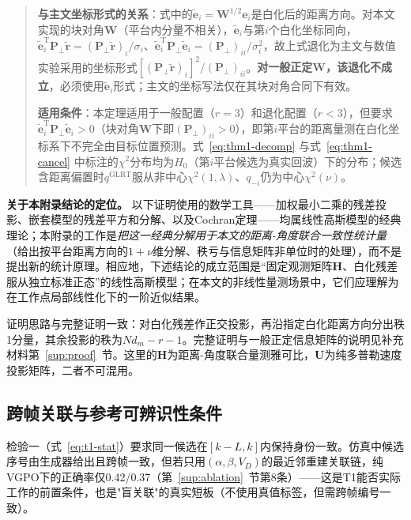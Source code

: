 \documentclass[UTF8,a4paper,zihao=-4]{ctexart}
\begin{document}
\begin{quote}
\textbf{与主文坐标形式的关系}：式中的\(\widetilde{\mathbf{e}}_i=\mathbf{W}^{1/2}\mathbf{e}_i\)是白化后的距离方向。对本文实现的块对角\(\mathbf{W}\)（平台内分量不相关），\(\widetilde{\mathbf{e}}_i\)与第\(i\)个白化坐标同向，\(\widetilde{\mathbf{e}}_i^{\mathrm{T}}\mathbf{P}_{\perp}\widetilde{\mathbf{r}}=(\mathbf{P}_{\perp}\widetilde{\mathbf{r}})_i/\sigma_i\)、\(\widetilde{\mathbf{e}}_i^{\mathrm{T}}\mathbf{P}_{\perp}\widetilde{\mathbf{e}}_i=(\mathbf{P}_{\perp})_{ii}/\sigma_i^2\)，故上式退化为主文与数值实验采用的坐标形式\([(\mathbf{P}_{\perp}\widetilde{\mathbf{r}})_i]^2/(\mathbf{P}_{\perp})_{ii}\)。\textbf{对一般正定\(\mathbf{W}\)，该退化不成立}，必须使用\(\widetilde{\mathbf{e}}_i\)形式；主文的坐标写法仅在其块对角合同下有效。

\textbf{适用条件}：本定理适用于一般配置（\(r=3\)）和退化配置（\(r<3\)），但要求\(\widetilde{\mathbf{e}}_i^{\mathrm T}\mathbf{P}_{\perp}\widetilde{\mathbf{e}}_i>0\)（块对角\(\mathbf{W}\)下即\((\mathbf{P}_{\perp})_{ii}>0\)），即第\(i\)平台的距离量测在白化坐标系下不完全由目标位置预测。式~\eqref{eq:thm1-decomp} 与式~\eqref{eq:thm1-cancel} 中标注的\(\chi^2\)分布均为\(H_0\)（第\(i\)平台候选为真实回波）下的分布；候选含距离偏置时\(q^{\mathrm{GLRT}}\)服从非中心\(\chi^2(1,\lambda)\)、\(q_{-i}\)仍为中心\(\chi^2(\nu)\)。
\end{quote}

\noindent\textbf{关于本附录结论的定位。} 以下证明使用的数学工具——加权最小二乘的残差投影、嵌套模型的残差平方和分解、以及Cochran定理——均属线性高斯模型的经典理论；本附录的工作是\emph{把这一经典分解用于本文的距离-角度联合一致性统计量}（给出按平台距离方向的\(1+\nu\)维分解、秩亏与信息矩阵非单位时的处理），而不是提出新的统计原理。相应地，下述结论的成立范围是“固定观测矩阵\(\boldsymbol H\)、白化残差服从独立标准正态”的线性高斯模型；在本文的非线性量测场景中，它们应理解为在工作点局部线性化下的一阶近似结果。

证明思路与完整证明一致：对白化残差作正交投影，再沿指定白化距离方向分出秩1分量，其余投影的秩为\(Nd_m-r-1\)。完整证明与一般正定信息矩阵的说明见补充材料第~\ref{sup:proof}~节。这里的\(\boldsymbol H\)为距离-角度联合量测雅可比，\(\boldsymbol U\)为纯多普勒速度投影矩阵，二者不可混用。


\subsection{跨帧关联与参考可辨识性条件}\label{sec:reference-conditions}
检验一（式~\eqref{eq:t1-stat}）要求同一候选在\([k-L,k]\)内保持身份一致。仿真中候选序号由生成器给出且跨帧一致，但若只用\((\alpha,\beta,V_D)\)的最近邻重建关联链，纯VGPO下的正确率仅0.42/0.37（第~\ref{sup:ablation}~节第8条）——这是T1能否实际工作的前置条件，也是"盲关联"的真实短板（不使用真值标签，但需跨帧编号一致）。
\end{document}
